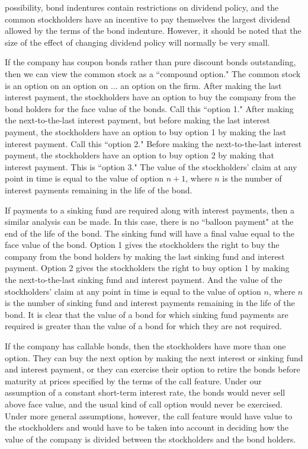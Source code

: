 \documentclass[a4paper, 12pt, twoside]{article}
\begin{document}
possibility, bond indentures contain restrictions on dividend policy, and the common 
stockholders have an incentive to pay themselves the largest dividend allowed by the 
terms of the bond indenture. However, it should be noted that the size of the effect 
of changing dividend policy will normally be very small.

If the company has coupon bonds rather than pure discount bonds outstanding, then we 
can view the common stock as a ``compound option." The common stock is an option on an 
option on ... an option on the firm. After making the last interest payment, the 
stockholders have an option to buy the company from the bond holders for the face 
value of the bonds. Call this ``option 1." After making the next-to-the-last interest 
payment, but before making the last interest payment, the stockholders have an option 
to buy option 1 by making the last interest payment. Call this ``option 2." Before 
making the next-to-the-last interest payment, the stockholders have an option to buy 
option 2 by making that interest payment. This is ``option 3." The value of the 
stockholders' claim at any point in time is equal to the value of option $n+1$, where $n$ 
is the number of interest payments remaining in the life of the bond.

If payments to a sinking fund are required along with interest payments, then a 
similar analysis can be made. In this case, there is no ``balloon payment" at the end 
of the life of the bond. The sinking fund will have a final value equal to the face 
value of the bond. Option 1 gives the stockholders the right to buy the company from 
the bond holders by making the last sinking fund and interest payment. Option 2 gives 
the stockholders the right to buy option 1 by making the next-to-the-last sinking fund 
and interest payment. And the value of the stockholders' claim at any point in time is 
equal to the value of option $n$, where $n$ is the number of sinking fund and interest 
payments remaining in the life of the bond. It is clear that the value of a bond for 
which sinking fund payments are required is greater than the value of a bond for which 
they are not required.

If the company has callable bonds, then the stockholders have more than one option. 
They can buy the next option by making the next interest or sinking fund and interest 
payment, or they can exercise their option to retire the bonds before maturity at 
prices specified by the terms of the call feature. Under our assumption of a constant 
short-term interest rate, the bonds would never sell above face value, and the usual 
kind of call option would never be exercised. Under more general assumptions, however, 
the call feature would have value to the stockholders and would have to be taken into 
account in deciding how the value of the company is divided between the stockholders 
and the bond holders.
\end{document}
